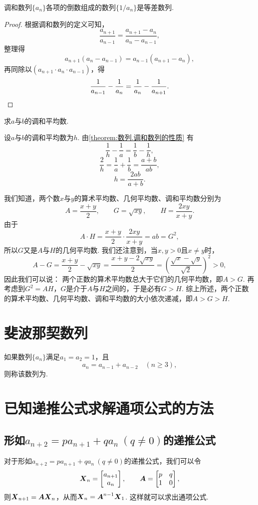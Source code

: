 \begin{property}\label{theorem:数列.调和数列的性质}
调和数列\(\{a_n\}\)各项的倒数组成的数列\(\{1/a_n\}\)是等差数列.
\begin{proof}
根据调和数列的定义可知，\[
    \frac{a_{n+1}}{a_{n-1}}
    = \frac{a_{n+1}-a_n}{a_n-a_{n-1}},
\]整理得\[
    a_{n+1} (a_n - a_{n-1})
    = a_{n-1} (a_{n+1} - a_n),
\]再同除以\((a_{n+1} \cdot a_n \cdot a_{n-1})\)，得\[
    \frac{1}{a_{n-1}} - \frac{1}{a_n}
    = \frac{1}{a_n} - \frac{1}{a_{n+1}}.
    \qedhere
\]
\end{proof}
\end{property}

\begin{example}
求\(a\)与\(b\)的调和平均数.
\begin{solution}
设\(a\)与\(b\)的调和平均数为\(h\).
由\cref{theorem:数列.调和数列的性质} 有\[
    \frac{1}{h} - \frac{1}{a}
    = \frac{1}{b} - \frac{1}{h},
\]\[
    \frac{2}{h} = \frac{1}{a} + \frac{1}{b}
    = \frac{a+b}{ab},
\]\[
    h = \frac{2ab}{a+b}.
\]
\end{solution}
\end{example}

我们知道，两个数\(x\)与\(y\)的算术平均数、几何平均数、调和平均数分别为\[
    A = \frac{x+y}{2}, \qquad
    G = \sqrt{xy}, \qquad
    H = \frac{2xy}{x+y}.
\]
由于\[
    A \cdot H = \frac{x+y}{2} \cdot \frac{2xy}{x+y}
    = ab = G^2,
\]
所以\(G\)又是\(A\)与\(H\)的几何平均数.
我们还注意到，当\(x,y>0\)且\(x \neq y\)时，\[
    A - G = \frac{x+y}{2} - \sqrt{xy}
    = \frac{x+y-2\sqrt{xy}}{2}
    = \left(\frac{\sqrt{x}-\sqrt{y}}{\sqrt{2}}\right)^2
    > 0,
\]
因此我们可以说：
两个正数的算术平均数总大于它们的几何平均数，即\(A > G\).
再考虑到\(G^2 = A H\)，\(G\)是介于\(A\)与\(H\)之间的，于是必有\(G > H\).
综上所述，两个正数的算术平均数、几何平均数、调和平均数的大小依次递减，即\(A > G > H\).

\section{斐波那契数列}
如果数列\(\{a_n\}\)满足\(a_1=a_2=1\)，且\[
a_n = a_{n-1} + a_{n-2} \quad(n\geq3),
\]则称该数列为.

\section{已知递推公式求解通项公式的方法}
\subsection{\texorpdfstring{形如\(a_{n+2}=p a_{n+1} + q a_n\ (q\neq0)\)的递推公式}{第一类递推公式}}
对于形如\(a_{n+2}=p a_{n+1} + q a_n\ (q\neq0)\)的递推公式，我们可以令\[
\boldsymbol{X}_n = \begin{bmatrix}
a_{n+1} \\
a_n
\end{bmatrix},
\qquad
\boldsymbol{A} = \begin{bmatrix}
p & q \\
1 & 0
\end{bmatrix},
\]则\(\boldsymbol{X}_{n+1} = \boldsymbol{A} \boldsymbol{X}_n\)，从而\(\boldsymbol{X}_n = \boldsymbol{A}^{n-1} \boldsymbol{X}_1\).
这样就可以求出通项公式.

